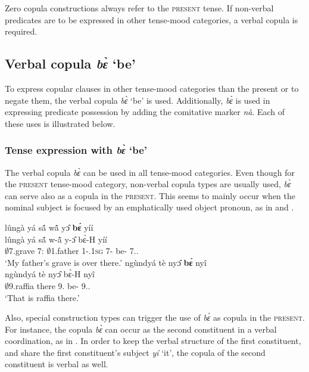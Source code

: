 \noindent Zero copula constructions always refer to the \textsc{present} tense. If non-verbal predicates are to be expressed in other tense-mood categories, a verbal copula is required. 







\subsection{Verbal copula {\itshape bɛ̀} `be'}
\label{sec:COPbe}

To express copular clauses in other tense-mood categories than the present or to negate them, the verbal copula {\itshape bɛ̀} `be' is used. Additionally, {\itshape bɛ̀} is used in expressing predicate possession by adding the comitative marker {\itshape nà}. Each of these uses is illustrated below.

\subsubsection*{Tense expression with {\itshape bɛ̀} `be'} The verbal copula {\itshape bɛ̀} can be used in all tense-mood categories. Even though for the \textsc{present} tense-mood category, non-verbal copula types are usually used, {\itshape bɛ̀} can serve also as a copula in the \textsc{present}. This seems to mainly occur when the nominal subject is focused by an emphatically used object pronoun, as in  and .


\ea \label{beEMPH1}
  \glll  lûngà yá sã́ wã̂ yɔ̂ {\bfseries bɛ́} yíí \\
         lûngà yá sã́ w-ã̂ y-ɔ̂ bɛ̀-H yíí \\
          $\emptyset$7.grave  7:{\ATT} $\emptyset$1.father 1-{\POSS}.1\textsc{sg} 7-{\OBJ} be-{\R} 7.{\DEM}.{\DIST} \\
    \trans `My father's grave is over there.'
\ex \label{beEMPH2}
  \glll   ngùndyá tè nyɔ̂ {\bfseries bɛ́} nyî \\
          ngùndyá tè nyɔ̂ bɛ̀-H nyî \\
           $\emptyset$9.raffia there 9.{\OBJ} be-{\R} 9.{\DEM}.{\PROX}  \\
    \trans `That is raffia there.'
\z

Also, special construction types can trigger the use of {\itshape bɛ̀} as copula in the \textsc{present}. For instance, the copula {\itshape bɛ̀} can occur as the second constituent in a verbal coordination, as in . In order to keep the verbal structure of the first constituent, and share the first constituent's subject {\itshape yí} `it', the copula of the second constituent is verbal as well.

